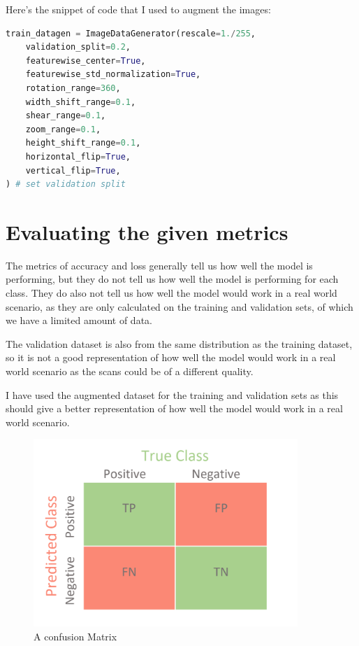 \documentclass[]{final_report}
\begin{document}

Here's the snippet of code that I used to augment the images:
\begin{lstlisting}[language=Python]
train_datagen = ImageDataGenerator(rescale=1./255,
    validation_split=0.2,
    featurewise_center=True,
    featurewise_std_normalization=True,
    rotation_range=360,
    width_shift_range=0.1,
    shear_range=0.1,
    zoom_range=0.1,
    height_shift_range=0.1,
    horizontal_flip=True,
    vertical_flip=True,
) # set validation split
\end{lstlisting}

\pagebreak

\section{Evaluating the given metrics}
The metrics of accuracy and loss generally tell us how well the model is performing,
but they do not tell us how well the model is performing for each class.
They do also not tell us how well the model would work in a real world scenario, 
as they are only calculated on the training and validation sets, of which we have a limited amount of data.

The validation dataset is also from the same distribution as the training dataset, 
so it is not a good representation of how well the model would work in a real world scenario 
as the scans could be of a different quality.

I have used the augmented dataset for the training and validation sets as this 
should give a better representation of how well the model would work in a real world scenario.

\begin{figure}[ht!]
  \centering
  \includegraphics[width=100mm]{images/ConfusionMatrix.png}
  \caption{A confusion Matrix\cite{ConfusionMatrix}}
\end{figure}
\pagebreak
\end{document}
